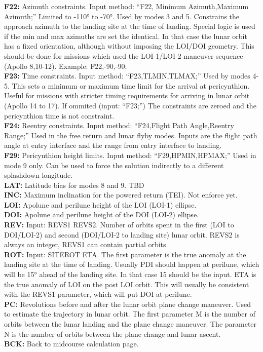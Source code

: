 \documentclass[11pt]{article} %
\begin{document}
\textbf{F22:} Azimuth constraints. Input method: “F22, Minimum Azimuth,Maximum Azimuth;” Limited to -110° to -70°. Used by modes 3 and 5. Constrains the approach azimuth to the landing site at the time of landing. Special logic is used if the min and max azimuths are set the identical. In that case the lunar orbit has a fixed orientation, although without imposing the LOI/DOI geometry. This should be done for missions which used the LOI-1/LOI-2 maneuver sequence (Apollo 8,10-12). Example: F22,-90,-90;\\
\textbf{F23:} Time constraints. Input method: “F23,TLMIN,TLMAX;” Used by modes 4-5. This sets a minimum or maximum time limit for the arrival at pericynthion. Useful for missions with stricter timing requirements for arriving in lunar orbit (Apollo 14 to 17). If ommited (input: “F23;”) The constraints are zeroed and the pericynthion time is not constraint.\\
\textbf{F24:} Reentry constraints. Input method: “F24,Flight Path Angle,Reentry Range;” Used in the free return and lunar flyby modes. Inputs are the flight path angle at entry interface and the range from entry interface to landing.\\
\textbf{F29:} Pericynthion height limits. Input method: “F29,HPMIN,HPMAX;” Used in mode 9 only. Can be used to force the solution indirectly to a different splashdown longitude.\\
\textbf{LAT:} Latitude bias for modes 8 and 9. TBD\\
\textbf{INC:} Maximum inclination for the powered return (TEI). Not enforce yet.\\
\textbf{LOI:} Apolune and perilune height of the LOI (LOI-1) ellipse.\\
\textbf{DOI:} Apolune and perilune height of the DOI (LOI-2) ellipse.\\
\textbf{REV:} Input: REVS1 REVS2. Number of orbits spent in the first (LOI to DOI/LOI-2) and second (DOI/LOI-2 to landing site) lunar orbit. REVS2 is always an integer, REVS1 can contain partial orbits.\\
\textbf{ROT:} Input: SITEROT ETA. The first parameter is the true anomaly at the landing site at the time of landing. Usually PDI should happen at perilune, which will be 15° ahead of the landing site. In that case 15 should be the input. ETA is the true anomaly of LOI on the post LOI orbit. This will usually be consistent with the REVS1 parameter, which will put DOI at perilune.\\
\textbf{PC:} Revolutions before and after the lunar orbit plane change maneuver. Used to estimate the trajectory in lunar orbit. The first parameter M is the number of orbits between the lunar landing and the plane change maneuver. The parameter N is the number of orbits between the plane change and lunar ascent.\\
\textbf{BCK:} Back to midcourse calculation page.\\
\newpage
\end{document}
